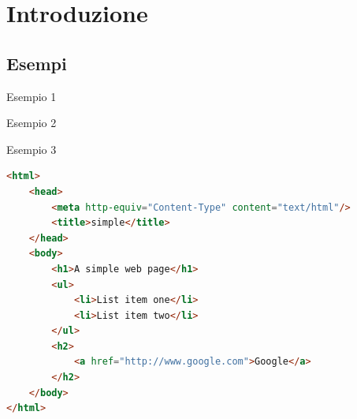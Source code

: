\FrameContent

\section{Introduzione}

\subsection{Esempi}


\begin{frame}{Esempio 1}


\end{frame}

\begin{frame}{Esempio 2}



\end{frame}

\begin{frame}[fragile,shrink=5]{Esempio 3}

\vspace{-12pt}
\begin{lstlisting}[language=html,tabsize=2]
<html>
    <head>
        <meta http-equiv="Content-Type" content="text/html"/>
        <title>simple</title>
    </head>
    <body>
        <h1>A simple web page</h1>
        <ul>
            <li>List item one</li>
            <li>List item two</li>
        </ul>
        <h2>
            <a href="http://www.google.com">Google</a>
        </h2>
    </body>
</html>
\end{lstlisting}

\end{frame}

